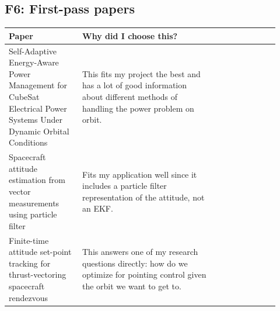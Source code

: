 \subsection{F6: First-pass papers}
\begin{longtable}{@{}p{0.25\linewidth}p{0.45\linewidth}p{0.22\linewidth}@{}}
  \toprule
  Paper & Why did I choose this? \\
  \midrule
  \endhead
  Self-Adaptive Energy-Aware Power Management for CubeSat Electrical Power Systems Under Dynamic Orbital Conditions & This fits my project the best and has a lot of good information about different methods of handling the power problem on orbit.\\
  Spacecraft attitude estimation from vector measurements using particle filter & Fits my application well since it includes a particle filter representation of the attitude, not an EKF.\\
  Finite-time attitude set-point tracking for thrust-vectoring spacecraft rendezvous & This answers one of my research questions directly: how do we optimize for pointing control given the orbit we want to get to.\\
  \bottomrule
\end{longtable}

